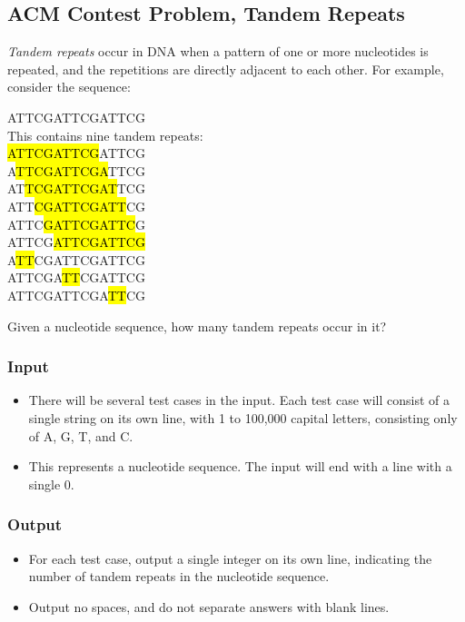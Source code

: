 \subsection{ACM Contest Problem, Tandem Repeats\cite{acmsoutheastregional2013}}
\textit{Tandem repeats} occur in DNA when a pattern of one or more nucleotides is repeated, and the repetitions are directly adjacent to each other.
For example, consider the sequence:
\begin{center}
	ATTCGATTCGATTCG\\
	This contains nine tandem repeats:\\
	\hl{ATTCGATTCG}ATTCG\\
	A\hl{TTCGATTCGA}TTCG\\
	AT\hl{TCGATTCGAT}TCG\\
	ATT\hl{CGATTCGATT}CG\\
	ATTC\hl{GATTCGATTC}G\\
	ATTCG\hl{ATTCGATTCG}\\
	A\hl{TT}CGATTCGATTCG\\
	ATTCGA\hl{TT}CGATTCG\\
	ATTCGATTCGA\hl{TT}CG\\
\end{center}

Given a nucleotide sequence, how many tandem repeats occur in it?

\subsubsection{Input}
\begin{itemize}
	\item There will be several test cases in the input.
	Each test case will consist of a single string on its own line, with 1 to 100,000 capital letters, consisting only of A, G, T, and C.
	\item This represents a nucleotide sequence.
	The input will end with a line with a single 0.
\end{itemize}


\subsubsection{Output}
\begin{itemize}
	\item For each test case, output a single integer on its own line, indicating the number of tandem repeats in the nucleotide sequence.
	\item Output no spaces, and do not separate answers with blank lines.
\end{itemize}

